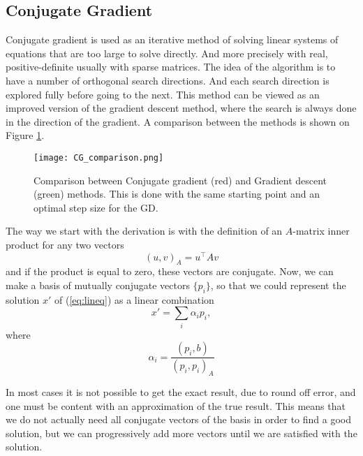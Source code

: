 \subsection{Conjugate Gradient}

Conjugate gradient is used as an iterative method of solving linear systems of equations that are too large to solve directly. And more precisely with real,  positive-definite usually with sparse matrices. The idea of the algorithm is to have a number of orthogonal search directions. And each search direction is explored fully before going to the next. This method can be viewed as an improved version of the gradient descent method, where the search is always done in the direction of the gradient. A comparison between the methods is shown on Figure \ref{fig:cg_comp}.
\begin{figure}[htbp]
    \centerline{\texttt{[image: CG\_comparison.png]}}
    \caption{Comparison between Conjugate gradient (red) and Gradient descent (green) methods. This is done with the same starting point and an optimal step size for the GD.}
    \label{fig:cg_comp}
\end{figure}

The way we start with the derivation is with the definition of an $A$-matrix inner product for any two vectors
\begin{equation}
    \left( u, v \right)_A = u^\top A v
    \label{eq:cg_constraint}
\end{equation}
and if the product is equal to zero, these vectors are conjugate. Now, we can make a basis of mutually conjugate vectors $\{ p_i \}$, so that we could represent the solution $x'$ of (\ref{eq:lineq}) as a linear combination
\begin{equation}
    x' = \sum_i \alpha_i p_i,
\end{equation}
where
\begin{equation}
    \alpha_i = \frac{\left( p_i, b \right)}{\left( p_i, p_i \right)_A}
\end{equation}

In most cases it is not possible to get the exact result, due to round off error, and one must be content with an approximation of the true result. This means that we do not actually need all conjugate vectors of the basis in order to find a good solution, but we can progressively add more vectors until we are satisfied with the solution.

